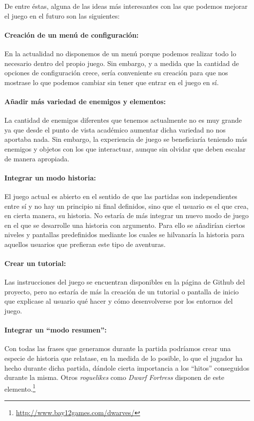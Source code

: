 De entre éstas, alguna de las ideas más interesantes con las que podemos mejorar el juego en el futuro son las siguientes: 

\paragraph{Creación de un menú de configuración:} En la actualidad no disponemos de un menú porque podemos realizar todo lo necesario dentro del propio juego. Sin embargo, y a medida que la cantidad de opciones de configuración crece, sería conveniente su creación para que nos mostrase lo que podemos cambiar sin tener que entrar en el juego en sí.

\paragraph{Añadir más variedad de enemigos y elementos:} La cantidad de enemigos diferentes que tenemos actualmente no es muy grande ya que desde el punto de vista académico aumentar dicha variedad no nos aportaba nada. Sin embargo, la experiencia de juego se beneficiaría teniendo más enemigos y objetos con los que interactuar, aunque sin olvidar que deben escalar de manera apropiada.

\paragraph{Integrar un modo historia:} El juego actual es abierto en el sentido de que las partidas son independientes entre sí y no hay un principio ni final definidos, sino que el usuario es el que crea, en cierta manera, su historia. 
No estaría de más integrar un nuevo modo de juego en el que se desarrolle una historia con argumento. Para ello se añadirían ciertos niveles y pantallas predefinidos mediante los cuales se hilvanaría la historia para aquellos usuarios que prefieran este tipo de aventuras.

\paragraph{Crear un tutorial:} Las instrucciones del juego se encuentran disponibles en la página de Github del proyecto, pero no estaría de más la creación de un tutorial o pantalla de inicio que explicase al usuario qué hacer y cómo desenvolverse por los entornos del juego.

\paragraph{Integrar un ``modo resumen'':} Con todas las frases que generamos durante la partida podríamos crear una especie de historia que relatase, en la medida de lo posible, lo que el jugador ha hecho durante dicha partida, dándole cierta importancia a los ``hitos'' conseguidos durante la misma. Otros \textit{roguelikes} como \textit{Dwarf Fortress} disponen de este elemento.\footnote{\url{http://www.bay12games.com/dwarves/}}

